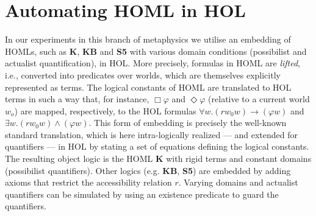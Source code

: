 \documentclass{llncs}
\newcommand{\imp}{{\rightarrow}}
\begin{document}








\section{Automating HOML in HOL}\label{sec:homlinhol}



In our experiments in this branch of metaphysics we
utilise an embedding of HOMLs, such as \textbf{K}, \textbf{KB} and
\textbf{S5} with various domain conditions (possibilist and actualist
quantification), in HOL. More precisely, formulas in HOML are \emph{lifted}, i.e., converted
into predicates over worlds, which are themselves explicitly
represented as terms. The logical constants of HOML are translated to
HOL terms in such a way that, for instance,
$\Box \varphi$ and $\Diamond \varphi$ (relative to a current world
$w_o$) are mapped, respectively, to the HOL formulas
$\forall w. (r w_0 w) \imp (\varphi w)$ and
$\exists w. (r w_0 w) \wedge (\varphi w)$. This form of embedding is
precisely the well-known standard translation,
which is here intra-logically realized --- and extended for
quantifiers --- in HOL by stating a set of equations defining the
logical constants. The resulting object logic is
the HOML \textbf{K} with rigid terms and constant domains (possibilist
quantifiers). Other logics (e.g. \textbf{KB}, \textbf{S5}) are
embedded by adding axioms that restrict the accessibility relation
$r$. Varying domains and actualist quantifiers can be simulated by
using an existence predicate to guard the quantifiers. 
\end{document}
